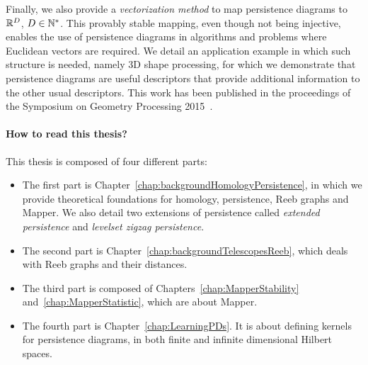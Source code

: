 Finally, we also provide a {\em vectorization method} to map persistence diagrams to $\mathbb{R}^D$, $D\in\mathbb{N}^*$. This provably stable mapping, even though not being injective,
enables the use of persistence diagrams in algorithms and problems where Euclidean vectors are required. We detail an application example in which
such structure is needed, namely 3D shape processing, for which we demonstrate that persistence diagrams are useful descriptors that provide additional information
to the  other usual descriptors. This work has been published in the proceedings of the Symposium on Geometry Processing 2015~\cite{Carriere15a}.  

   

\paragraph*{How to read this thesis?}
This thesis is composed of four different parts:
\begin{itemize}
\item The first part is Chapter~\ref{chap:backgroundHomologyPersistence}, in which we provide theoretical foundations for homology, persistence, Reeb graphs and Mapper. 
We also detail two extensions of persistence called {\em extended persistence} and {\em levelset zigzag persistence}. 

\item The second part is Chapter~\ref{chap:backgroundTelescopesReeb}, which deals with Reeb graphs and their distances.
\item The third part is composed of Chapters~\ref{chap:MapperStability} and~\ref{chap:MapperStatistic}, which are about Mapper.


\item The fourth part is Chapter~\ref{chap:LearningPDs}. It is about defining kernels for persistence diagrams, in both
finite and infinite dimensional Hilbert spaces. 

\end{itemize}

